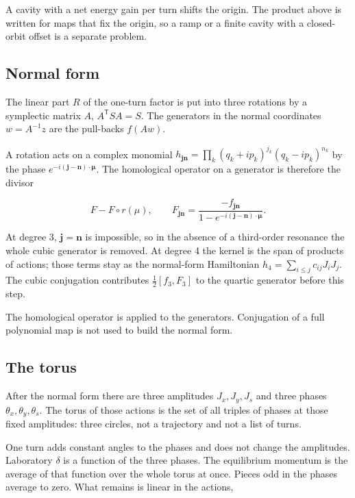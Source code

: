 \documentclass[11pt,a4paper]{article}
\begin{document}
A cavity with a net energy gain per turn shifts the origin. The product
above is written for maps that fix the origin, so a ramp or a finite cavity
with a closed-orbit offset is a separate problem.

\subsection{Normal form}

The linear part $R$ of the one-turn factor is put into three rotations by
a symplectic matrix $A$, $A^\mathsf{T}SA=S$. The generators in the
normal coordinates $w=A^{-1}z$ are the pull-backs $f(Aw)$.

A rotation acts on a complex monomial
$h_{\mathbf{j}\mathbf{n}}=\prod_k(q_k+ip_k)^{j_k}(q_k-ip_k)^{n_k}$ by the
phase $e^{-i(\mathbf{j}-\mathbf{n})\cdot\boldsymbol{\mu}}$. The homological
operator on a generator is therefore the divisor

\[
F-F\circ r(\mu),\qquad
F_{\mathbf{j}\mathbf{n}}=\frac{-f_{\mathbf{j}\mathbf{n}}}{1-e^{-i(\mathbf{j}-\mathbf{n})\cdot\boldsymbol{\mu}}}.
\]

At degree 3, $\mathbf{j}=\mathbf{n}$ is impossible, so in the absence of
a third-order resonance the whole cubic generator is removed. At degree 4
the kernel is the span of products of actions; those terms stay as the
normal-form Hamiltonian $h_4=\sum_{i\le j}c_{ij}J_i J_j$. The cubic
conjugation contributes $\tfrac12[f_3,F_3]$ to the quartic generator
before this step.

The homological operator is applied to the generators. Conjugation of a
full polynomial map is not used to build the normal form.

\subsection{The torus}

After the normal form there are three amplitudes $J_x,J_y,J_s$ and three
phases $\theta_x,\theta_y,\theta_s$. The torus of those actions is the set
of all triples of phases at those fixed amplitudes: three circles, not a
trajectory and not a list of turns.

One turn adds constant angles to the phases and does not change the
amplitudes. Laboratory $\delta$ is a function of the three phases. The
equilibrium momentum is the average of that function over the whole torus
at once. Pieces odd in the phases average to zero. What remains is linear
in the actions,
\end{document}
